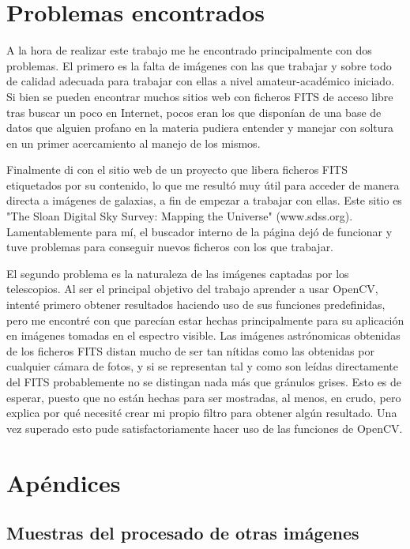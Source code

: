 \documentclass[a4paper,12pt]{article}
\begin{document}
\section{Problemas encontrados}
A la hora de realizar este trabajo me he encontrado principalmente con dos problemas. El primero es la falta de imágenes con las que trabajar y sobre todo de calidad adecuada para trabajar con ellas a nivel amateur-académico iniciado. Si bien se pueden encontrar muchos sitios web con ficheros FITS de acceso libre tras buscar un poco en Internet, pocos eran los que disponían de una base de datos que alguien profano en la materia pudiera entender y manejar con soltura en un primer acercamiento al manejo de los mismos.

Finalmente di con el sitio web de un proyecto que libera ficheros FITS etiquetados por su contenido, lo que me resultó muy útil para acceder de manera directa a imágenes de galaxias, a fin de empezar a trabajar con ellas. Este sitio es "The Sloan Digital Sky Survey: Mapping the Universe" (www.sdss.org). Lamentablemente para mí, el buscador interno de la página dejó de funcionar y tuve problemas para conseguir nuevos ficheros con los que trabajar.

El segundo problema es la naturaleza de las imágenes captadas por los telescopios. Al ser el principal objetivo del trabajo aprender a usar OpenCV, intenté primero obtener resultados haciendo uso de sus funciones predefinidas, pero me encontré con que parecían estar hechas principalmente para su aplicación en imágenes tomadas en el espectro visible. Las imágenes astrónomicas obtenidas de los ficheros FITS distan mucho de ser tan nítidas como las obtenidas por cualquier cámara de fotos, y si se representan tal y como son leídas directamente del FITS probablemente no se distingan nada más que gránulos grises. Esto es de esperar, puesto que no están hechas para ser mostradas, al menos, en crudo, pero explica por qué necesité crear mi propio filtro para obtener algún resultado. Una vez superado esto pude satisfactoriamente hacer uso de las funciones de OpenCV.


\label{sec:Problemas}


\appendix
\section{Apéndices}
\subsection{Muestras del procesado de otras imágenes}
\end{document}
